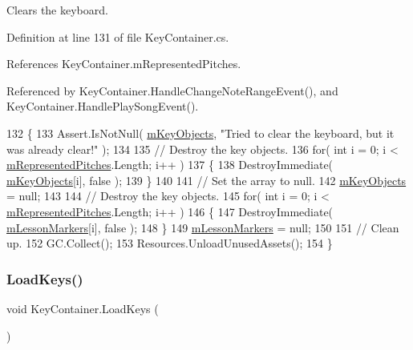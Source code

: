 Clears the keyboard. 



Definition at line 131 of file Key\+Container.\+cs.



References Key\+Container.\+m\+Represented\+Pitches.



Referenced by Key\+Container.\+Handle\+Change\+Note\+Range\+Event(), and Key\+Container.\+Handle\+Play\+Song\+Event().


\begin{DoxyCode}
132     \{
133         Assert.IsNotNull( \hyperlink{group___key_contain_priv_var_ga01addf187bb12ffe824374df98e2c2d8}{mKeyObjects}, \textcolor{stringliteral}{"Tried to clear the keyboard, but it was already clear!"} 
      );
134 
135         \textcolor{comment}{// Destroy the key objects.}
136         \textcolor{keywordflow}{for}( \textcolor{keywordtype}{int} i = 0; i < \hyperlink{group___key_contain_priv_var_ga103945a6efe3469191e5253d13fec5be}{mRepresentedPitches}.Length; i++ )
137         \{
138             DestroyImmediate( \hyperlink{group___key_contain_priv_var_ga01addf187bb12ffe824374df98e2c2d8}{mKeyObjects}[i], \textcolor{keyword}{false} );
139         \}
140 
141         \textcolor{comment}{// Set the array to null.}
142         \hyperlink{group___key_contain_priv_var_ga01addf187bb12ffe824374df98e2c2d8}{mKeyObjects} = null;
143 
144         \textcolor{comment}{// Destroy the key objects.}
145         \textcolor{keywordflow}{for}( \textcolor{keywordtype}{int} i = 0; i < \hyperlink{group___key_contain_priv_var_ga103945a6efe3469191e5253d13fec5be}{mRepresentedPitches}.Length; i++ )
146         \{
147             DestroyImmediate( \hyperlink{group___key_contain_priv_var_gaf21490115ecf2b80c1bd382d7469a08c}{mLessonMarkers}[i], \textcolor{keyword}{false} );
148         \}
149         \hyperlink{group___key_contain_priv_var_gaf21490115ecf2b80c1bd382d7469a08c}{mLessonMarkers} = null;
150 
151         \textcolor{comment}{// Clean up.}
152         GC.Collect();
153         Resources.UnloadUnusedAssets();
154     \}
\end{DoxyCode}
\mbox{\label{group___key_contain_priv_func_ga65f79700f265d2223681ac95981ab4a3}} 
\subsubsection{\texorpdfstring{Load\+Keys()}{LoadKeys()}}
{\footnotesize\ttfamily void Key\+Container.\+Load\+Keys (\begin{DoxyParamCaption}{ }\end{DoxyParamCaption})\hspace{0.3cm}{\ttfamily [private]}}



